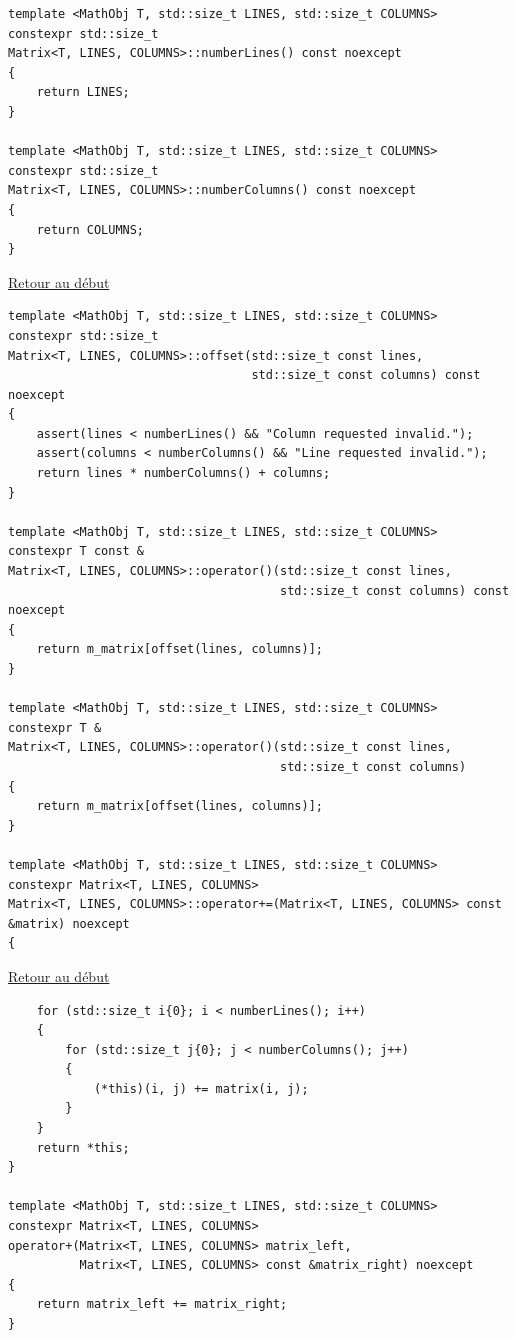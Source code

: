 {\begin{frame}[fragile]
\begin{verbatim}
template <MathObj T, std::size_t LINES, std::size_t COLUMNS>
constexpr std::size_t
Matrix<T, LINES, COLUMNS>::numberLines() const noexcept
{
	return LINES;
}

template <MathObj T, std::size_t LINES, std::size_t COLUMNS>
constexpr std::size_t
Matrix<T, LINES, COLUMNS>::numberColumns() const noexcept
{
	return COLUMNS;
}

\end{verbatim}
\end{frame}

\begin{frame}[fragile]
\hyperlink{conclusion}{Retour au début}\newline
\begin{verbatim}
template <MathObj T, std::size_t LINES, std::size_t COLUMNS>
constexpr std::size_t
Matrix<T, LINES, COLUMNS>::offset(std::size_t const lines,
								  std::size_t const columns) const noexcept
{
	assert(lines < numberLines() && "Column requested invalid.");
	assert(columns < numberColumns() && "Line requested invalid.");
	return lines * numberColumns() + columns;
}

template <MathObj T, std::size_t LINES, std::size_t COLUMNS>
constexpr T const &
Matrix<T, LINES, COLUMNS>::operator()(std::size_t const lines,
									  std::size_t const columns) const noexcept
{
	return m_matrix[offset(lines, columns)];
}

template <MathObj T, std::size_t LINES, std::size_t COLUMNS>
constexpr T &
Matrix<T, LINES, COLUMNS>::operator()(std::size_t const lines,
									  std::size_t const columns)
{
	return m_matrix[offset(lines, columns)];
}

template <MathObj T, std::size_t LINES, std::size_t COLUMNS>
constexpr Matrix<T, LINES, COLUMNS>
Matrix<T, LINES, COLUMNS>::operator+=(Matrix<T, LINES, COLUMNS> const &matrix) noexcept
{
\end{verbatim}
\end{frame}

\begin{frame}[fragile]
\hyperlink{conclusion}{Retour au début}\newline
\begin{verbatim}
	for (std::size_t i{0}; i < numberLines(); i++)
	{
		for (std::size_t j{0}; j < numberColumns(); j++)
		{
			(*this)(i, j) += matrix(i, j);
		}
	}
	return *this;
}

template <MathObj T, std::size_t LINES, std::size_t COLUMNS>
constexpr Matrix<T, LINES, COLUMNS>
operator+(Matrix<T, LINES, COLUMNS> matrix_left,
		  Matrix<T, LINES, COLUMNS> const &matrix_right) noexcept
{
	return matrix_left += matrix_right;
}


\end{verbatim}
\end{frame}}
